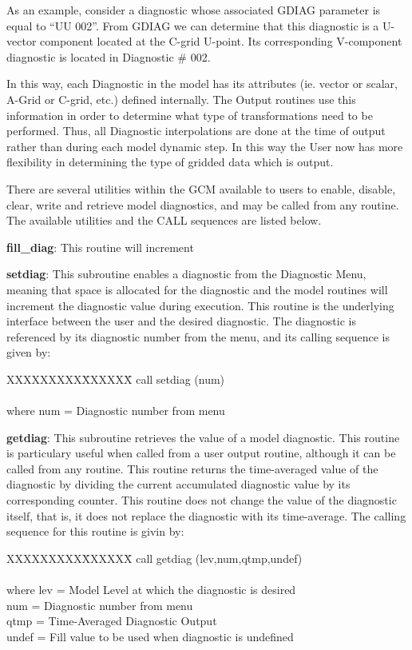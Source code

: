 As an example, consider a diagnostic whose associated GDIAG parameter is equal
to ``UU  002''.  From GDIAG we can determine that this diagnostic is a 
U-vector component located at the C-grid U-point.
Its corresponding V-component diagnostic is located in Diagnostic \# 002.

In this way, each Diagnostic in the model has its attributes (ie. vector or scalar,
A-Grid or C-grid, etc.) defined internally.  The Output routines
use this information in order to determine
what type of transformations need to be performed.  Thus, all Diagnostic
interpolations are done at the time of output rather than during each model dynamic step.
In this way the User now has more flexibility
in determining the type of gridded data which is output.

There are several utilities within the GCM available to users to enable, disable,
clear, write and retrieve model diagnostics, and may be called from any routine.  
The available utilities and the CALL sequences are listed below.

{\bf fill\_diag}:  This routine will increment 

{\bf setdiag}:  This subroutine enables a diagnostic from the Diagnostic Menu, meaning 
that space is allocated for the diagnostic and the model routines will increment the 
diagnostic value during execution.  This routine is the underlying interface
between the user and the desired diagnostic.  The diagnostic is referenced by its diagnostic
number from the menu, and its calling sequence is given by:

\begin{tabbing}
XXXXXXXXX\=XXXXXX\= \kill
\>        call setdiag (num) \\
\\
where \>  num   \>= Diagnostic number from menu \\
\end{tabbing}

{\bf getdiag}:  This subroutine retrieves the value of a model diagnostic.  This routine 
is particulary useful when called from a user output routine, although it can be called 
from any routine.  This routine returns the time-averaged value of the diagnostic by
dividing the current accumulated diagnostic value by its corresponding counter.  This 
routine does not change the value of the diagnostic itself, that is, it does not replace 
the diagnostic with its time-average.  The calling sequence for this routine is givin by:

\begin{tabbing}
XXXXXXXXX\=XXXXXX\= \kill
\>        call getdiag (lev,num,qtmp,undef) \\
\\
where \>  lev   \>= Model Level at which the diagnostic is desired \\
      \>  num   \>= Diagnostic number from menu \\
      \>  qtmp  \>= Time-Averaged Diagnostic Output \\
      \>  undef \>= Fill value to be used when diagnostic is undefined \\
\end{tabbing}

